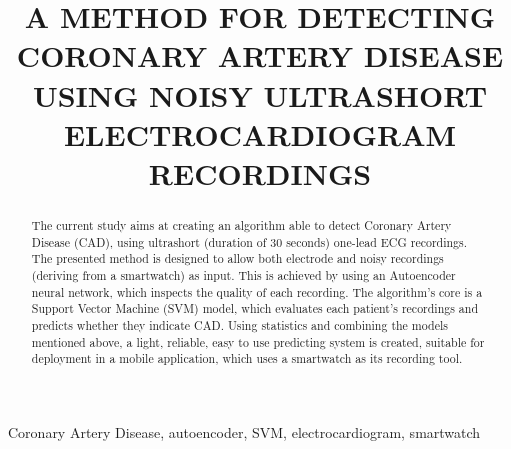 \def\x{{\mathbf x}}
\def\L{{\cal L}}

\title{A METHOD FOR DETECTING CORONARY ARTERY DISEASE USING NOISY ULTRASHORT ELECTROCARDIOGRAM RECORDINGS}
%
 \address{$^{\dagger}$Department of Electrical \& Computer Eng., Khalifa University, PO Box 127788, UAE\\
 $^{\star}$ Department of Electrical \& Computer Eng., Aristotle University of Thessaloniki, GR-54124, Greece}
 
 
%
%
%

%
\maketitle
%
\begin{abstract}
The current study aims at creating an algorithm able to detect Coronary Artery Disease (CAD), using ultrashort (duration of 30 seconds) one-lead ECG recordings. The presented method is designed to allow both electrode and noisy recordings (deriving from a smartwatch) as input. This is achieved by using an Autoencoder neural network, which inspects the quality of each recording. The algorithm's core is a Support Vector Machine (SVM) model, which evaluates each patient's recordings and predicts whether they indicate CAD. Using statistics and combining the models mentioned above, a light, reliable, easy to use predicting system is created, suitable for deployment in a mobile application, which uses a smartwatch as its recording tool.
\end{abstract}
%
\begin{keywords}
Coronary Artery Disease, autoencoder, SVM, electrocardiogram, smartwatch
\end{keywords}
%
